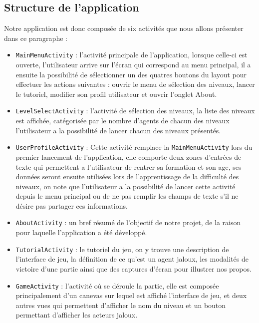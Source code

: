 \documentclass[a4paper, 11pt]{article}
\begin{document}
	\subsection{Structure de l'application}
Notre application est donc composée de six activités que nous allons présenter dans ce paragraphe :
\hfill \break
\begin{itemize}
 \item \texttt{MainMenuActivity} : l'activité principale de l'application, lorsque celle-ci est ouverte, l'utilisateur arrive sur l'écran qui correspond au menu principal, il a ensuite la possibilité de sélectionner un des quatres boutons du layout pour effectuer les actions suivantes : ouvrir le menu de sélection des niveaux, lancer le tutoriel, modifier son profil utilisateur et ouvrir l'onglet About.
 \item \texttt{LevelSelectActivity} : l'activité de sélection des niveaux, la liste des niveaux est affichée, catégorisée par le nombre d'agents de chacun des niveaux l'utilisateur a la possibilité de lancer chacun des niveaux présentés.
 \item \texttt{UserProfileActivity} : Cette activité remplace la \texttt{MainMenuActivity} lors du premier lancement de l'application, elle comporte deux zones d'entrées de texte qui permettent a l'utilisateur de rentrer sa formation et son age, ses données seront ensuite utilisées lors de l'apprentissage de la difficulté des niveaux, on note que l'utilisateur a la possibilité de lancer cette activité depuis le menu principal ou de ne pas remplir les champs de texte s'il ne désire pas partager ces informations. 
 \item\texttt{AboutActivity} : un bref résumé de l'objectif de notre projet, de la raison pour laquelle l'application a été développé.
 \item\texttt{TutorialActivity} : le tutoriel du jeu, on y trouve une description de l'interface de jeu, la définition de ce qu'est un agent jaloux, les modalités de victoire d'une partie ainsi que des captures d'écran pour illustrer nos propos.
 \item \texttt{GameActivity} : l'activité où se déroule la partie, elle est composée principalement d'un canevas sur lequel est affiché l'interface de jeu, et deux autres vues qui permettent d'afficher le nom du niveau et un bouton permettant d'afficher les acteurs jaloux.
 \end{itemize}  
 
\end{document}
